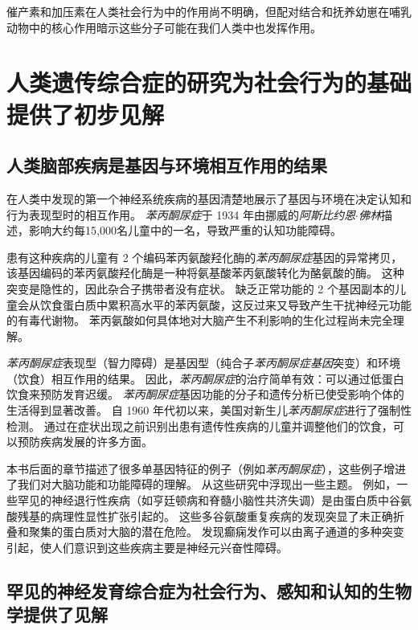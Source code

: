 催产素和加压素在人类社会行为中的作用尚不明确，但配对结合和抚养幼崽在哺乳动物中的核心作用暗示这些分子可能在我们人类中也发挥作用。



\section{人类遗传综合症的研究为社会行为的基础提供了初步见解}

\subsection{人类脑部疾病是基因与环境相互作用的结果}

在人类中发现的第一个神经系统疾病的基因清楚地展示了基因与环境在决定认知和行为表现型时的相互作用。
\textit{苯丙酮尿症}于 1934 年由挪威的\textit{阿斯比约恩$\cdot$佛林}描述，影响大约每15,000名儿童中的一名，导致严重的认知功能障碍。


患有这种疾病的儿童有 2 个编码苯丙氨酸羟化酶的\textit{苯丙酮尿症}基因的异常拷贝，该基因编码的苯丙氨酸羟化酶是一种将氨基酸苯丙氨酸转化为酪氨酸的酶。
这种突变是隐性的，因此杂合子携带者没有症状。
缺乏正常功能的 2 个基因副本的儿童会从饮食蛋白质中累积高水平的苯丙氨酸，这反过来又导致产生干扰神经元功能的有毒代谢物。
苯丙氨酸如何具体地对大脑产生不利影响的生化过程尚未完全理解。


\textit{苯丙酮尿症}表现型（智力障碍）是基因型（纯合子\textit{苯丙酮尿症基因}突变）和环境（饮食）相互作用的结果。
因此，\textit{苯丙酮尿症}的治疗简单有效：可以通过低蛋白饮食来预防发育迟缓。
\textit{苯丙酮尿症}基因功能的分子和遗传分析已使受影响个体的生活得到显著改善。
自 1960 年代初以来，美国对新生儿\textit{苯丙酮尿症}进行了强制性检测。
通过在症状出现之前识别出患有遗传性疾病的儿童并调整他们的饮食，可以预防疾病发展的许多方面。


本书后面的章节描述了很多单基因特征的例子（例如\textit{苯丙酮尿症}），这些例子增进了我们对大脑功能和功能障碍的理解。
从这些研究中浮现出一些主题。
例如，一些罕见的神经退行性疾病（如亨廷顿病和脊髓小脑性共济失调）是由蛋白质中谷氨酸残基的病理性显性扩张引起的。
这些多谷氨酸重复疾病的发现突显了未正确折叠和聚集的蛋白质对大脑的潜在危险。
发现癫痫发作可以由离子通道的多种突变引起，使人们意识到这些疾病主要是神经元兴奋性障碍。



\subsection{罕见的神经发育综合症为社会行为、感知和认知的生物学提供了见解}

